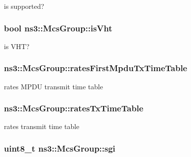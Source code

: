 is supported? 

\subsubsection[{\texorpdfstring{is\+Vht}{isVht}}]{\setlength{\rightskip}{0pt plus 5cm}bool ns3\+::\+Mcs\+Group\+::is\+Vht}\hypertarget{structns3_1_1McsGroup_a4109174f594db5a213631c4204add485}{}\label{structns3_1_1McsGroup_a4109174f594db5a213631c4204add485}


is V\+HT? 

\subsubsection[{\texorpdfstring{rates\+First\+Mpdu\+Tx\+Time\+Table}{ratesFirstMpduTxTimeTable}}]{ ns3\+::\+Mcs\+Group\+::rates\+First\+Mpdu\+Tx\+Time\+Table}\hypertarget{structns3_1_1McsGroup_a27870f9027db266aa95dc7e572e3315f}{}\label{structns3_1_1McsGroup_a27870f9027db266aa95dc7e572e3315f}


rates M\+P\+DU transmit time table 

\subsubsection[{\texorpdfstring{rates\+Tx\+Time\+Table}{ratesTxTimeTable}}]{ ns3\+::\+Mcs\+Group\+::rates\+Tx\+Time\+Table}\hypertarget{structns3_1_1McsGroup_a13ede0696c8ce7c764c8ba972ed3bdd1}{}\label{structns3_1_1McsGroup_a13ede0696c8ce7c764c8ba972ed3bdd1}


rates transmit time table 

\subsubsection[{\texorpdfstring{sgi}{sgi}}]{\setlength{\rightskip}{0pt plus 5cm}uint8\+\_\+t ns3\+::\+Mcs\+Group\+::sgi}\hypertarget{structns3_1_1McsGroup_ab8ec2c393f734b2f4ca08150eb3f83f4}{}\label{structns3_1_1McsGroup_ab8ec2c393f734b2f4ca08150eb3f83f4}


